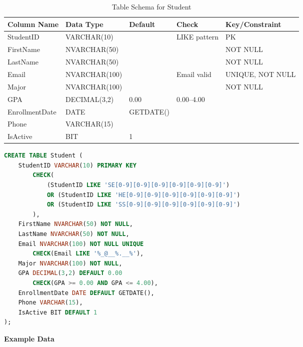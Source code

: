 \documentclass[12pt,a4paper]{report}
\begin{document}
\begin{table}[ht]
\centering
\small
\begin{tabular}{|l|l|l|l|l|}
\hline
\textbf{Column Name} & \textbf{Data Type} & \textbf{Default} & \textbf{Check} & \textbf{Key/Constraint} \\ \hline
StudentID & VARCHAR(10) & & LIKE pattern & PK \\ \hline
FirstName & NVARCHAR(50) & & & NOT NULL \\ \hline
LastName & NVARCHAR(50) & & & NOT NULL \\ \hline
Email & NVARCHAR(100) & & Email valid & UNIQUE, NOT NULL \\ \hline
Major & NVARCHAR(100) & & & NOT NULL \\ \hline
GPA & DECIMAL(3,2) & 0.00 & 0.00--4.00 & \\ \hline
EnrollmentDate & DATE & GETDATE() & & \\ \hline
Phone & VARCHAR(15) & & & \\ \hline
IsActive & BIT & 1 & & \\ \hline
\end{tabular}
\caption{Table Schema for Student}
\label{tab:student_schema}
\end{table}

\vspace{0.3cm}

\begin{lstlisting}[language=SQL, caption=Create Table Student]
CREATE TABLE Student (
    StudentID VARCHAR(10) PRIMARY KEY 
        CHECK(
            (StudentID LIKE 'SE[0-9][0-9][0-9][0-9][0-9][0-9]') 
            OR (StudentID LIKE 'HE[0-9][0-9][0-9][0-9][0-9][0-9]') 
            OR (StudentID LIKE 'SS[0-9][0-9][0-9][0-9][0-9][0-9]')
        ),
    FirstName NVARCHAR(50) NOT NULL,
    LastName NVARCHAR(50) NOT NULL,
    Email NVARCHAR(100) NOT NULL UNIQUE 
        CHECK(Email LIKE '%_@__%.__%'),
    Major NVARCHAR(100) NOT NULL,
    GPA DECIMAL(3,2) DEFAULT 0.00 
        CHECK(GPA >= 0.00 AND GPA <= 4.00),
    EnrollmentDate DATE DEFAULT GETDATE(),
    Phone VARCHAR(15),
    IsActive BIT DEFAULT 1
);
\end{lstlisting}

\textbf{Example Data}
\end{document}
